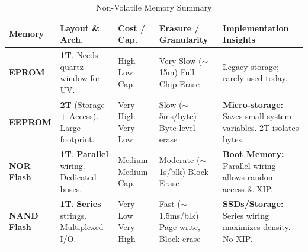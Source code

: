 \documentclass[10pt]{article}
\begin{document}
\begin{table}[H]
    \centering
    \footnotesize 
    \renewcommand{\arraystretch}{1.2} 
    \begin{tabular}{@{} l p{2.8cm} p{1.8cm} p{3cm} p{3.8cm} @{}}
        \toprule
        \textbf{Memory} & \textbf{Layout \& Arch.} & \textbf{Cost / Cap.} & \textbf{Erasure / Granularity} & \textbf{Implementation Insights} \\
        \midrule
        \textbf{EPROM} & 
        \textbf{1T}. Needs quartz window for UV. & 
        High \newline Low Cap. & 
        Very Slow ($\sim$15m) \newline Full Chip Erase & 
        Legacy storage; rarely used today. \\
        
        \textbf{EEPROM} & 
        \textbf{2T} (Storage + Access). Large footprint. & 
        Very High \newline Very Low & 
        Slow ($\sim$5ms/byte) \newline Byte-level erase & 
        \textbf{Micro-storage:} Saves small system variables. 2T isolates bytes. \\
        
        \textbf{NOR Flash} & 
        \textbf{1T}. \textbf{Parallel} wiring. Dedicated buses. & 
        Medium \newline Medium Cap. & 
        Moderate ($\sim$1s/blk) \newline Block Erase & 
        \textbf{Boot Memory:} Parallel wiring allows random access \& XIP. \\
        
        \textbf{NAND Flash} & 
        \textbf{1T}. \textbf{Series} strings. Multiplexed I/O. & 
        Very Low \newline Very High & 
        Fast ($\sim$1.5ms/blk) \newline Page write, Block erase & 
        \textbf{SSDs/Storage:} Series wiring maximizes density. No XIP. \\
        \bottomrule
    \end{tabular}
    \caption{Non-Volatile Memory Summary}
\end{table}
\end{document}

